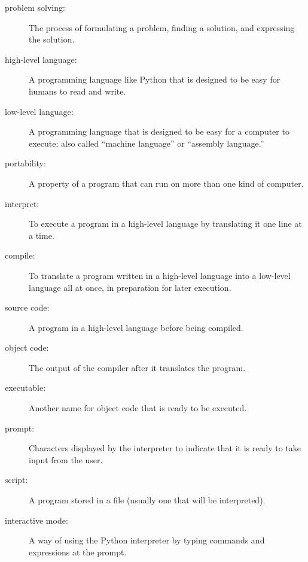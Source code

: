 \documentclass[10pt]{book}
\begin{document}
\begin{description}

\item[problem solving:]  The process of formulating a problem, finding
a solution, and expressing the solution.

\item[high-level language:]  A programming language like Python that
is designed to be easy for humans to read and write.

\item[low-level language:]  A programming language that is designed
to be easy for a computer to execute; also called ``machine language'' or
``assembly language.''

\item[portability:]  A property of a program that can run on more
than one kind of computer.

\item[interpret:]  To execute a program in a high-level language
by translating it one line at a time.

\item[compile:]  To translate a program written in a high-level language
into a low-level language all at once, in preparation for later
execution.

\item[source code:]  A program in a high-level language before
being compiled.

\item[object code:]  The output of the compiler after it translates
the program.

\item[executable:]  Another name for object code that is ready
to be executed.

\item[prompt:] Characters displayed by the interpreter to indicate
that it is ready to take input from the user.

\item[script:] A program stored in a file (usually one that will be
interpreted).

\item[interactive mode:] A way of using the Python interpreter by
typing commands and expressions at the prompt.


\end{description}
\end{document}
